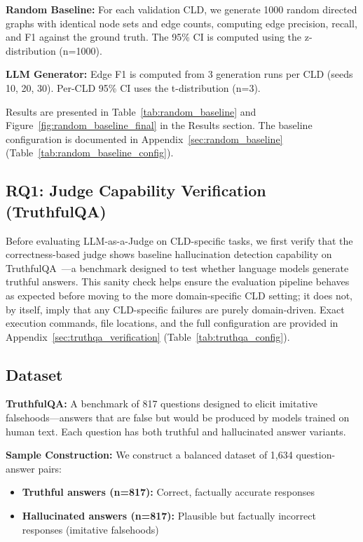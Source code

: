 \textbf{Random Baseline:} For each validation CLD, we generate 1000 random directed graphs with identical node sets and edge counts, computing edge precision, recall, and F1 against the ground truth. The 95\% CI is computed using the z-distribution (n=1000).

\textbf{LLM Generator:} Edge F1 is computed from 3 generation runs per CLD (seeds 10, 20, 30). Per-CLD 95\% CI uses the t-distribution (n=3).

Results are presented in Table~\ref{tab:random_baseline} and Figure~\ref{fig:random_baseline_final} in the Results section.
The baseline configuration is documented in Appendix~\ref{sec:random_baseline} (Table~\ref{tab:random_baseline_config}).

\subsection{RQ1: Judge Capability Verification (TruthfulQA)}

Before evaluating LLM-as-a-Judge on CLD-specific tasks, we first verify that the correctness-based judge shows baseline hallucination detection capability on TruthfulQA~\cite{lin2022truthfulqa}---a benchmark designed to test whether language models generate truthful answers. This sanity check helps ensure the evaluation pipeline behaves as expected before moving to the more domain-specific CLD setting; it does not, by itself, imply that any CLD-specific failures are purely domain-driven.
Exact execution commands, file locations, and the full configuration are provided in Appendix~\ref{sec:truthqa_verification} (Table~\ref{tab:truthqa_config}).

\subsection{Dataset}

\textbf{TruthfulQA:} A benchmark of 817 questions designed to elicit imitative falsehoods---answers that are false but would be produced by models trained on human text. Each question has both truthful and hallucinated answer variants.

\textbf{Sample Construction:} We construct a balanced dataset of 1,634 question-answer pairs:
\begin{itemize}[noitemsep]
    \item \textbf{Truthful answers (n=817):} Correct, factually accurate responses
    \item \textbf{Hallucinated answers (n=817):} Plausible but factually incorrect responses (imitative falsehoods)
\end{itemize}

